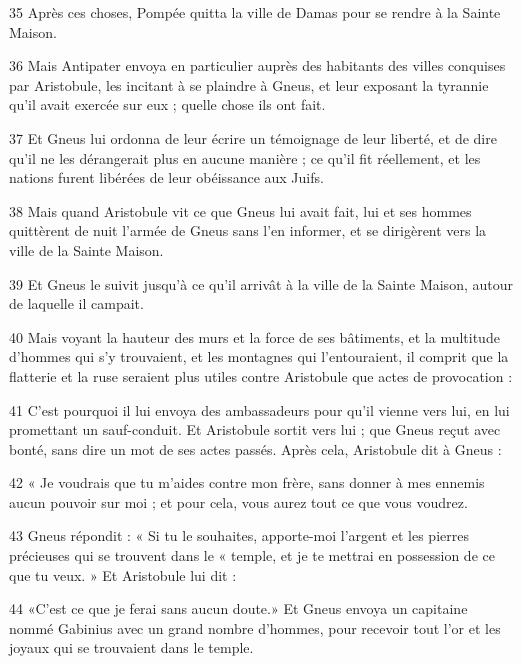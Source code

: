 \par 35 Après ces choses, Pompée quitta la ville de Damas pour se rendre à la Sainte Maison.

\par 36 Mais Antipater envoya en particulier auprès des habitants des villes conquises par Aristobule, les incitant à se plaindre à Gneus, et leur exposant la tyrannie qu'il avait exercée sur eux ; quelle chose ils ont fait.

\par 37 Et Gneus lui ordonna de leur écrire un témoignage de leur liberté, et de dire qu'il ne les dérangerait plus en aucune manière ; ce qu'il fit réellement, et les nations furent libérées de leur obéissance aux Juifs.

\par 38 Mais quand Aristobule vit ce que Gneus lui avait fait, lui et ses hommes quittèrent de nuit l'armée de Gneus sans l'en informer, et se dirigèrent vers la ville de la Sainte Maison.

\par 39 Et Gneus le suivit jusqu'à ce qu'il arrivât à la ville de la Sainte Maison, autour de laquelle il campait.

\par 40 Mais voyant la hauteur des murs et la force de ses bâtiments, et la multitude d'hommes qui s'y trouvaient, et les montagnes qui l'entouraient, il comprit que la flatterie et la ruse seraient plus utiles contre Aristobule que actes de provocation :

\par 41 C'est pourquoi il lui envoya des ambassadeurs pour qu'il vienne vers lui, en lui promettant un sauf-conduit. Et Aristobule sortit vers lui ; que Gneus reçut avec bonté, sans dire un mot de ses actes passés. Après cela, Aristobule dit à Gneus :

\par 42 « Je voudrais que tu m'aides contre mon frère, sans donner à mes ennemis aucun pouvoir sur moi ; et pour cela, vous aurez tout ce que vous voudrez.

\par 43 Gneus répondit : « Si tu le souhaites, apporte-moi l'argent et les pierres précieuses qui se trouvent dans le « temple, et je te mettrai en possession de ce que tu veux. » Et Aristobule lui dit :

\par 44 «C'est ce que je ferai sans aucun doute.» Et Gneus envoya un capitaine nommé Gabinius avec un grand nombre d'hommes, pour recevoir tout l'or et les joyaux qui se trouvaient dans le temple.

